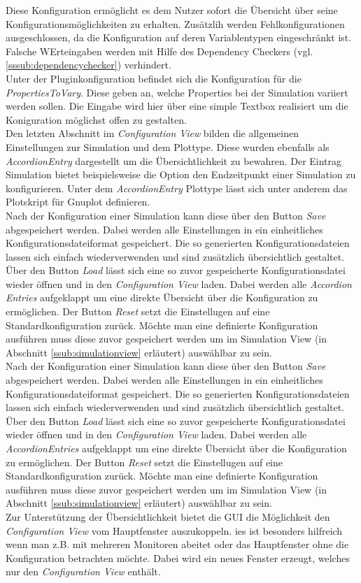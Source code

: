\documentclass[a4paper, 11pt]{article} %
\begin{document}
 Diese Konfiguration ermöglicht es dem Nutzer sofort die Übersicht über seine Konfigurationsmöglichkeiten zu erhalten. Zusätzlih werden Fehlkonfigurationen ausgeschlossen, da die Konfiguration auf deren Variablentypen eingeschränkt ist. Falsche WErteingaben werden mit Hilfe des Dependency Checkers (vgl. \ref{sssub:dependencychecker}) verhindert. \\
 Unter der Pluginkonfiguration befindet sich die Konfiguration für die \emph{PropertiesToVary}. Diese geben an, welche Properties bei der Simulation variiert werden sollen. Die Eingabe wird hier über eine simple Textbox realisiert um die Koniguration möglichst offen zu gestalten. \\
 Den letzten Abschnitt im \emph{Configuration View} bilden die allgemeinen Einstellungen zur Simulation und dem Plottype. Diese wurden ebenfalls als \emph{AccordionEntry} dargestellt um die Übersichtlichkeit zu bewahren. Der Eintrag Simulation bietet beispielsweise die Option den Endzeitpunkt einer Simulation zu konfigurieren. Unter dem \emph{AccordionEntry} Plottype lässt sich unter anderem das Plotskript für Gnuplot definieren.\\
 Nach der Konfiguration einer Simulation kann diese über den Button \emph{Save} abgespeichert werden. Dabei werden alle Einstellungen in ein einheitliches Konfigurationsdateiformat gespeichert. Die so generierten Konfigurationsdateien lassen sich einfach wiederverwenden und sind zusätzlich übersichtlich gestaltet. Über den Button \emph{Load} lässt sich eine so zuvor gespeicherte Konfigurationsdatei wieder öffnen und in den \emph{Configuration View} laden. Dabei werden alle \emph{Accordion Entries} aufgeklappt um eine direkte Übersicht über die Konfiguration zu ermöglichen. Der Button \emph{Reset} setzt die Einstellugen auf eine Standardkonfiguration zurück. Möchte man eine definierte Konfiguration ausführen muss diese zuvor gespeichert werden um im Simulation View (in Abschnitt \ref{ssub:simulationview} erläutert) auswählbar zu sein.\\
 Nach der Konfiguration einer Simulation kann diese über den Button \emph{Save} abgespeichert werden. Dabei werden alle Einstellungen in ein einheitliches Konfigurationsdateiformat gespeichert. Die so generierten Konfigurationsdateien lassen sich einfach wiederverwenden und sind zusätzlich übersichtlich gestaltet. Über den Button \emph{Load} lässt sich eine so zuvor gespeicherte Konfigurationsdatei wieder öffnen und in den \emph{Configuration View} laden. Dabei werden alle \emph{AccordionEntries} aufgeklappt um eine direkte Übersicht über die Konfiguration zu ermöglichen. Der Button \emph{Reset} setzt die Einstellugen auf eine Standardkonfiguration zurück. Möchte man eine definierte Konfiguration ausführen muss diese zuvor gespeichert werden um im Simulation View (in Abschnitt \ref{ssub:simulationview} erläutert) auswählbar zu sein.\\
 Zur Unterstützung der Übersichtlichkeit bietet die GUI die Möglichkeit den \emph{Configuration View} vom Hauptfenster auszukoppeln. ies ist besonders hilfreich wenn man z.B. mit mehreren Monitoren abeitet oder das Hauptfenster ohne die Konfiguration betrachten möchte. Dabei wird ein neues Fenster erzeugt, welches nur den \emph{Configuration View} enthält.
\end{document}
